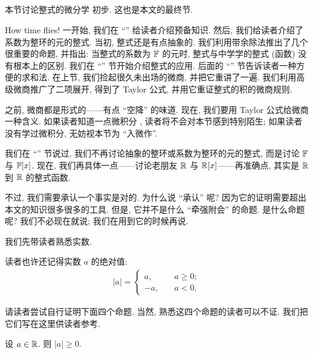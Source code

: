 \subsection*{\IntroductionToDifferentialCalculusOnPolynomials}
\markright{\IntroductionToDifferentialCalculusOnPolynomials}

本节讨论整式的微分学  初步. 这也是本文的最终节.

How time flies! 一开始, 我们在 ``\Prerequisites'' 给读者介绍预备知识. 然后, 我们给读者介绍了系数为整环的元的整式. 当初, 整式还是有点抽象的. 我们利用带余除法推出了几个很重要的命题, 并指出: 当整式的系数为 $\mathbb{F}$ 的元时, 整式与中学学的整式 (函数) 没有根本上的区别. 我们在 ``\Interpolation'' 节开始介绍整式的应用. 后面的 ``\SummationFormulae'' 节告诉读者一种方便的求和法. 在上节, 我们捡起很久未出场的微商, 并把它重讲了一遍. 我们利用高级微商推广了二项展开, 得到了 Taylor 公式, 并用它重证整式的积的微商规则.

之前, 微商都是形式的——有点 ``空降'' 的味道. 现在, 我们要用 Taylor 公式给微商一种含义. 如果读者知道一点微积分 , 读者将不会对本节感到特别陌生; 如果读者没有学过微积分, 无妨视本节为 ``入微作''.

我们在 ``\PolynomialsOverF'' 节说过, 我们不再讨论抽象的整环或系数为整环的元的整式, 而是讨论 $\mathbb{F}$ 与 $\mathbb{F}[x]$. 现在, 我们再具体一点——讨论老朋友 $\mathbb{R}$ 与 $\mathbb{R}[x]$——再准确点, 其实是 $\mathbb{R}$ 到 $\mathbb{R}$ 的整式函数.

不过, 我们需要承认一个事实是对的. 为什么说 ``承认'' 呢? 因为它的证明需要超出本文的知识很多很多的工具. 但是, 它并不是什么 ``牵强附会'' 的命题. 是什么命题呢? 我们不必现在就说; 我们在用到它的时候再说.

我们先带读者熟悉实数.

读者也许还记得实数 $a$ 的绝对值:
\begin{align*}
    |a| = \begin{cases}
        a,  & \quad a \geq 0; \\
        -a, & \quad a < 0.
    \end{cases}
\end{align*}

请读者尝试自行证明下面四个命题. 当然, 熟悉这四个命题的读者可以不证. 我们把它们写在这里供读者参考.

\begin{proposition}
    设 $a \in \mathbb{R}$. 则 $|a| \geq 0$.
\end{proposition}

